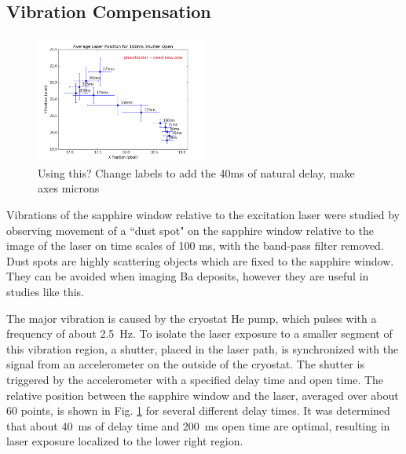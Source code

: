 \documentclass[aps,pra,reprint,superscriptaddress]{revtex4-1}
\begin{document}
\subsection{Vibration Compensation}
\label{subsec:vibes}

\begin{figure}
\includegraphics[width=0.5\textwidth]{figures/vibes_avepos_placeholder_100msShutter.png}
\caption{\color{gray}Using this?  Change labels to add the 40ms of natural delay, make axes microns}
\label{fig:vibes}
\end{figure}


Vibrations of the sapphire window relative to the excitation laser were studied by observing movement of a ``dust spot" on the sapphire window relative to the image of the laser on time scales of 100 ms, with the band-pass filter removed.  Dust spots are highly scattering objects which are fixed to the sapphire window.  They can be avoided when imaging Ba deposits, however they are useful in studies like this.

The major vibration is caused by the cryostat He pump, which pulses with a frequency of about 2.5~Hz.  To isolate the laser exposure to a smaller segment of this vibration region, a shutter, placed in the laser path, is synchronized with the signal from an accelerometer on the outside of the cryostat.  The shutter is triggered by the accelerometer with a specified delay time and open time.  The relative position between the sapphire window and the laser, averaged over about 60 points, is shown in Fig. \ref{fig:vibes} for several different delay times.  It was determined that about 40~ms of delay time and 200~ms open time are optimal, resulting in laser exposure localized to the lower right region. %
\end{document}
